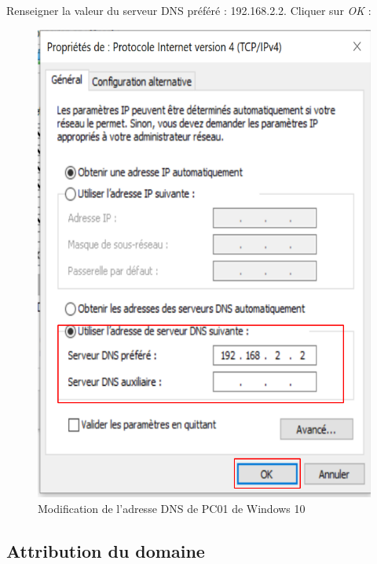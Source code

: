 Renseigner la valeur du serveur DNS préféré : 192.168.2.2. Cliquer sur \textit{OK} :
\begin{figure}[h!]
	\begin{center}
		\includegraphics[scale=0.8]{W_Screenshots/45.png}
		\caption{Modification de l'adresse DNS de PC01 de Windows 10}
		\label{W_Screenshots/45}
	\end{center}
\end{figure}
\FloatBarrier 
    
\subsection{Attribution du domaine}

